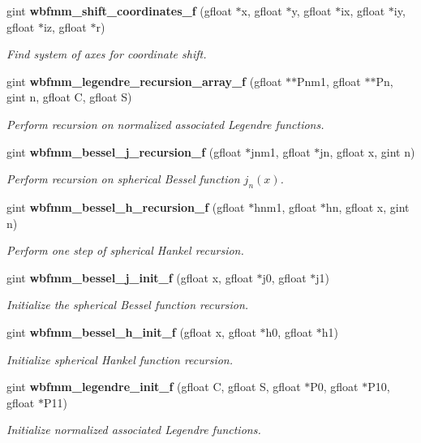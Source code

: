 \begin{DoxyCompactItemize}
gint {\bf wbfmm\+\_\+shift\+\_\+coordinates\+\_\+f} (gfloat $\ast$x, gfloat $\ast$y, gfloat $\ast$ix, gfloat $\ast$iy, gfloat $\ast$iz, gfloat $\ast$r)
\begin{DoxyCompactList}\small\item\em Find system of axes for coordinate shift. \end{DoxyCompactList}\item 
gint {\bf wbfmm\+\_\+legendre\+\_\+recursion\+\_\+array\+\_\+f} (gfloat $\ast$$\ast$Pnm1, gfloat $\ast$$\ast$Pn, gint n, gfloat C, gfloat S)
\begin{DoxyCompactList}\small\item\em Perform recursion on normalized associated Legendre functions. \end{DoxyCompactList}\item 
gint {\bf wbfmm\+\_\+bessel\+\_\+j\+\_\+recursion\+\_\+f} (gfloat $\ast$jnm1, gfloat $\ast$jn, gfloat x, gint n)
\begin{DoxyCompactList}\small\item\em Perform recursion on spherical Bessel function $j_{n}(x)$. \end{DoxyCompactList}\item 
gint {\bf wbfmm\+\_\+bessel\+\_\+h\+\_\+recursion\+\_\+f} (gfloat $\ast$hnm1, gfloat $\ast$hn, gfloat x, gint n)
\begin{DoxyCompactList}\small\item\em Perform one step of spherical Hankel recursion. \end{DoxyCompactList}\item 
gint {\bf wbfmm\+\_\+bessel\+\_\+j\+\_\+init\+\_\+f} (gfloat x, gfloat $\ast$j0, gfloat $\ast$j1)
\begin{DoxyCompactList}\small\item\em Initialize the spherical Bessel function recursion. \end{DoxyCompactList}\item 
gint {\bf wbfmm\+\_\+bessel\+\_\+h\+\_\+init\+\_\+f} (gfloat x, gfloat $\ast$h0, gfloat $\ast$h1)
\begin{DoxyCompactList}\small\item\em Initialize spherical Hankel function recursion. \end{DoxyCompactList}\item 
gint {\bf wbfmm\+\_\+legendre\+\_\+init\+\_\+f} (gfloat C, gfloat S, gfloat $\ast$P0, gfloat $\ast$P10, gfloat $\ast$P11)
\begin{DoxyCompactList}\small\item\em Initialize normalized associated Legendre functions. \end{DoxyCompactList}\item 

\end{DoxyCompactItemize}
